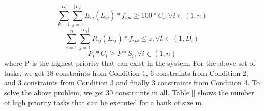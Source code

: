 \newline
\begin{equation}\label{eq2}
\sum_{k = 1}^{D_{i}} \sum_{j = 1}^{|L_{i}|} E_{ij}(L_{ij}) * f_{ijk} \geq 100 * C_i, \forall i \in (1,n)
\end{equation}
\newline
\begin{equation}\label{eq3}
\sum_{i = 1}^{n} \sum_{j = 1}^{|L_{i}|} R_{ij}(L_{ij}) * f_{ijk} \leq z, \forall k \in (1,D_{i})
\end{equation}
\newline
\begin{equation}
P_{i} * C_{i} \geq P * S_{i}, \forall i \in (1,n)
\end{equation}
where P is the highest priority that can exist in the system.
\newline
\newline
For the above set of tasks, we get 18 constraints from Condition 1, 6 constraints from Condition 2, and 3 constraints from 
Condition 3 and finally 3 constraints from Condition 4. To solve the above problem, we get 30 constraints in all. Table \ref{} 
shows the number of high priority tasks that can be executed for a bank of size m.
 


